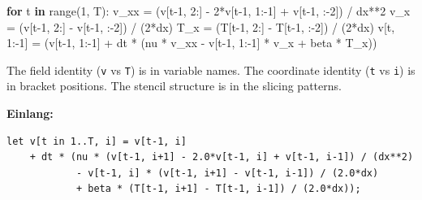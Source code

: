 \documentclass[11pt,titlepage]{article}
\newenvironment{Shaded}{}{}
\newcommand{\BuiltInTok}[1]{#1}
\newcommand{\ControlFlowTok}[1]{\textcolor[rgb]{0.00,0.44,0.13}{\textbf{#1}}}
\newcommand{\DecValTok}[1]{\textcolor[rgb]{0.25,0.63,0.44}{#1}}
\newcommand{\KeywordTok}[1]{\textcolor[rgb]{0.00,0.44,0.13}{\textbf{#1}}}
\newcommand{\NormalTok}[1]{#1}
\newcommand{\OperatorTok}[1]{\textcolor[rgb]{0.40,0.40,0.40}{#1}}
\begin{document}
\begin{Shaded}
\begin{Highlighting}[]
\ControlFlowTok{for}\NormalTok{ t }\KeywordTok{in} \BuiltInTok{range}\NormalTok{(}\DecValTok{1}\NormalTok{, T):}
\NormalTok{    v_xx }\OperatorTok{=}\NormalTok{ (v[t}\DecValTok{-1}\NormalTok{, }\DecValTok{2}\NormalTok{:] }\OperatorTok{-} \DecValTok{2}\OperatorTok{*}\NormalTok{v[t}\DecValTok{-1}\NormalTok{, }\DecValTok{1}\NormalTok{:}\OperatorTok{-}\DecValTok{1}\NormalTok{] }\OperatorTok{+}\NormalTok{ v[t}\DecValTok{-1}\NormalTok{, :}\OperatorTok{-}\DecValTok{2}\NormalTok{]) }\OperatorTok{/}\NormalTok{ dx}\OperatorTok{**}\DecValTok{2}
\NormalTok{    v_x }\OperatorTok{=}\NormalTok{ (v[t}\DecValTok{-1}\NormalTok{, }\DecValTok{2}\NormalTok{:] }\OperatorTok{-}\NormalTok{ v[t}\DecValTok{-1}\NormalTok{, :}\OperatorTok{-}\DecValTok{2}\NormalTok{]) }\OperatorTok{/}\NormalTok{ (}\DecValTok{2}\OperatorTok{*}\NormalTok{dx)}
\NormalTok{    T_x }\OperatorTok{=}\NormalTok{ (T[t}\DecValTok{-1}\NormalTok{, }\DecValTok{2}\NormalTok{:] }\OperatorTok{-}\NormalTok{ T[t}\DecValTok{-1}\NormalTok{, :}\OperatorTok{-}\DecValTok{2}\NormalTok{]) }\OperatorTok{/}\NormalTok{ (}\DecValTok{2}\OperatorTok{*}\NormalTok{dx)}
\NormalTok{    v[t, }\DecValTok{1}\NormalTok{:}\OperatorTok{-}\DecValTok{1}\NormalTok{] }\OperatorTok{=}\NormalTok{ (v[t}\DecValTok{-1}\NormalTok{, }\DecValTok{1}\NormalTok{:}\OperatorTok{-}\DecValTok{1}\NormalTok{]}
                  \OperatorTok{+}\NormalTok{ dt }\OperatorTok{*}\NormalTok{ (nu }\OperatorTok{*}\NormalTok{ v_xx}
                          \OperatorTok{-}\NormalTok{ v[t}\DecValTok{-1}\NormalTok{, }\DecValTok{1}\NormalTok{:}\OperatorTok{-}\DecValTok{1}\NormalTok{] }\OperatorTok{*}\NormalTok{ v_x}
                          \OperatorTok{+}\NormalTok{ beta }\OperatorTok{*}\NormalTok{ T_x))}
\end{Highlighting}
\end{Shaded}

The field identity (\texttt{v} vs \texttt{T}) is in variable names. The
coordinate identity (\texttt{t} vs \texttt{i}) is in bracket positions.
The stencil structure is in the slicing patterns.

\textbf{Einlang:}

\begin{verbatim}
let v[t in 1..T, i] = v[t-1, i]
    + dt * (nu * (v[t-1, i+1] - 2.0*v[t-1, i] + v[t-1, i-1]) / (dx**2)
            - v[t-1, i] * (v[t-1, i+1] - v[t-1, i-1]) / (2.0*dx)
            + beta * (T[t-1, i+1] - T[t-1, i-1]) / (2.0*dx));
\end{verbatim}
\end{document}

